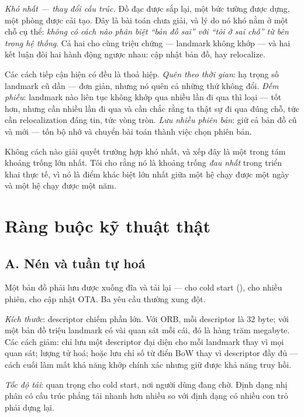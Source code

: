 \documentclass[../../vslam.tex]{subfiles}
\begin{document}
\emph{Khó nhất --- thay đổi cấu trúc.} Đồ đạc được sắp lại, một bức tường được dựng, một phòng được cải tạo. Đây là bài toán chưa giải, và lý do nó khó nằm ở một chỗ cụ thể: \emph{không có cách nào phân biệt ``bản đồ sai'' với ``tôi ở sai chỗ'' từ bên trong hệ thống}. Cả hai cho cùng triệu chứng --- landmark không khớp --- và hai kết luận đòi hai hành động ngược nhau: cập nhật bản đồ, hay relocalize.

Các cách tiếp cận hiện có đều là thoả hiệp. \emph{Quên theo thời gian}: hạ trọng số landmark cũ dần --- đơn giản, nhưng nó quên cả những thứ không đổi. \emph{Đếm phiếu}: landmark nào liên tục không khớp qua nhiều lần đi qua thì loại --- tốt hơn, nhưng cần nhiều lần đi qua và cần chắc rằng ta thật sự đi qua đúng chỗ, tức cần relocalization đáng tin, tức vòng tròn. \emph{Lưu nhiều phiên bản}: giữ cả bản đồ cũ và mới --- tốn bộ nhớ và chuyển bài toán thành việc chọn phiên bản.

Không cách nào giải quyết trường hợp khó nhất, và  xếp đây là một trong tám khoảng trống lớn nhất. Tôi cho rằng nó là khoảng trống \emph{đau nhất} trong triển khai thực tế, vì nó là điểm khác biệt lớn nhất giữa một hệ chạy được một ngày và một hệ chạy được một năm.

\section{Ràng buộc kỹ thuật thật}

\subsection{A. Nén và tuần tự hoá}

Một bản đồ phải lưu được xuống đĩa và tải lại --- cho cold start (), cho nhiều phiên, cho cập nhật OTA. Ba yêu cầu thường xung đột.

\emph{Kích thước}: descriptor chiếm phần lớn. Với ORB, mỗi descriptor là \(32\) byte; với một bản đồ triệu landmark có vài quan sát mỗi cái, đó là hàng trăm megabyte. Các cách giảm: chỉ lưu một descriptor đại diện cho mỗi landmark thay vì mọi quan sát; lượng tử hoá; hoặc lưu chỉ số từ điển BoW thay vì descriptor đầy đủ --- cách cuối làm mất khả năng khớp chính xác nhưng giữ được khả năng truy hồi.

\emph{Tốc độ tải}: quan trọng cho cold start, nơi người dùng đang chờ. Định dạng nhị phân có cấu trúc phẳng tải nhanh hơn nhiều so với định dạng có nhiều con trỏ phải dựng lại.
\end{document}
